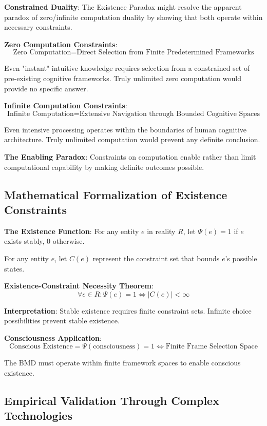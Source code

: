 \documentclass[12pt]{article}
\begin{document}
\textbf{Constrained Duality}: The Existence Paradox might resolve the apparent paradox of zero/infinite computation duality by showing that both operate within necessary constraints.

\textbf{Zero Computation Constraints}:
$$\text{Zero Computation} = \text{Direct Selection from Finite Predetermined Frameworks}$$

Even "instant" intuitive knowledge requires selection from a constrained set of pre-existing cognitive frameworks. Truly unlimited zero computation would provide no specific answer.

\textbf{Infinite Computation Constraints}:
$$\text{Infinite Computation} = \text{Extensive Navigation through Bounded Cognitive Spaces}$$

Even intensive processing operates within the boundaries of human cognitive architecture. Truly unlimited computation would prevent any definite conclusion.

\textbf{The Enabling Paradox}:
Constraints on computation enable rather than limit computational capability by making definite outcomes possible.

\subsection{Mathematical Formalization of Existence Constraints}

\textbf{The Existence Function}:
For any entity $e$ in reality $R$, let $\Psi(e) = 1$ if $e$ exists stably, 0 otherwise.

For any entity $e$, let $C(e)$ represent the constraint set that bounds $e$'s possible states.

\textbf{Existence-Constraint Necessity Theorem}:
$$\forall e \in R: \Psi(e) = 1 \Leftrightarrow |C(e)| < \infty$$

\textbf{Interpretation}: Stable existence requires finite constraint sets. Infinite choice possibilities prevent stable existence.

\textbf{Consciousness Application}:
$$\text{Conscious Existence} = \Psi(\text{consciousness}) = 1 \Leftrightarrow \text{Finite Frame Selection Space}$$

The BMD must operate within finite framework spaces to enable conscious existence.

\subsection{Empirical Validation Through Complex Technologies}
\end{document}
